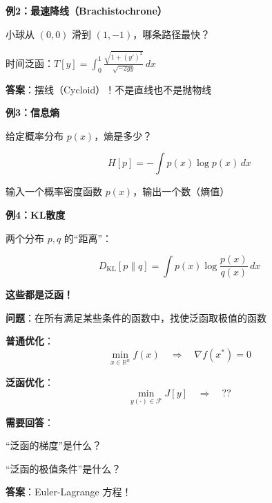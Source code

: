 \documentclass[12pt, a4paper]{ctexart}
\begin{document}
\begin{blackboard}[泛函的具体例子（续）]

\textbf{例2：最速降线（Brachistochrone）}

小球从 $(0, 0)$ 滑到 $(1, -1)$，哪条路径最快？

\begin{center}
\end{center}

时间泛函：$T[y] = \int_0^1 \frac{\sqrt{1 + (y')^2}}{\sqrt{-2gy}} \, dx$

\textbf{答案}：摆线（Cycloid）！不是直线也不是抛物线

\end{blackboard}

\begin{blackboard}[泛函的具体例子（续）]

\textbf{例3：信息熵}

给定概率分布 $p(x)$，熵是多少？

\[
H[p] = -\int p(x) \log p(x) \, dx
\]

输入一个概率密度函数 $p(x)$，输出一个数（熵值）

\textbf{例4：KL散度}

两个分布 $p, q$ 的``距离''：

\[
D_{\text{KL}}[p \| q] = \int p(x) \log \frac{p(x)}{q(x)} \, dx
\]

\textbf{这些都是泛函！}

\end{blackboard}

\begin{blackboard}[泛函优化的目标]

\textbf{问题}：在所有满足某些条件的函数中，找使泛函取极值的函数

\textbf{普通优化}：
\[
\min_{x \in \mathbb{R}^n} f(x) \quad \Rightarrow \quad \nabla f(x^*) = 0
\]

\textbf{泛函优化}：
\[
\min_{y(\cdot) \in \mathcal{F}} J[y] \quad \Rightarrow \quad \text{??}
\]

\textbf{需要回答}：

``泛函的梯度''是什么？

``泛函的极值条件''是什么？

\textbf{答案}：Euler-Lagrange 方程！

\end{blackboard}
\end{document}
